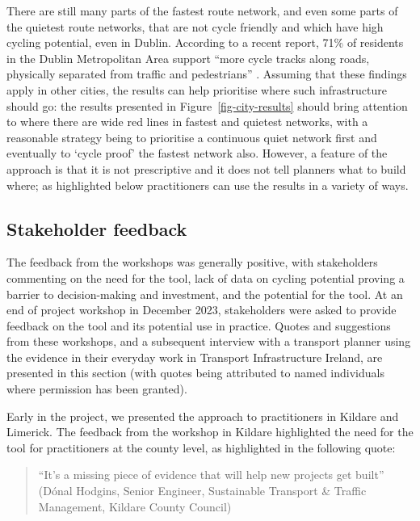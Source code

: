 \documentclass[
  super,
  preprint,
  3p]{elsarticle}
\begin{document}
There are still many parts of the fastest route network, and even some
parts of the quietest route networks, that are not cycle friendly and
which have high cycling potential, even in Dublin. According to a recent
report, 71\% of residents in the Dublin Metropolitan Area support ``more
cycle tracks along roads, physically separated from traffic and
pedestrians'' \citep{walking2021}. Assuming that these findings apply in
other cities, the results can help prioritise where such infrastructure
should go: the results presented in Figure~\ref{fig-city-results} should
bring attention to where there are wide red lines in fastest and
quietest networks, with a reasonable strategy being to prioritise a
continuous quiet network first and eventually to `cycle proof' the
fastest network also. However, a feature of the approach is that it is
not prescriptive and it does not tell planners what to build where; as
highlighted below practitioners can use the results in a variety of
ways.

\subsection{Stakeholder feedback}\label{sec-qualitative}

The feedback from the workshops was generally positive, with
stakeholders commenting on the need for the tool, lack of data on
cycling potential proving a barrier to decision-making and investment,
and the potential for the tool. At an end of project workshop in
December 2023, stakeholders were asked to provide feedback on the tool
and its potential use in practice. Quotes and suggestions from these
workshops, and a subsequent interview with a transport planner using the
evidence in their everyday work in Transport Infrastructure Ireland, are
presented in this section (with quotes being attributed to named
individuals where permission has been granted).

Early in the project, we presented the approach to practitioners in
Kildare and Limerick. The feedback from the workshop in Kildare
highlighted the need for the tool for practitioners at the county level,
as highlighted in the following quote:

\begin{quote}
``It's a missing piece of evidence that will help new projects get
built'' (Dónal Hodgins, Senior Engineer, Sustainable Transport \&
Traffic Management, Kildare County Council)
\end{quote}
\end{document}
